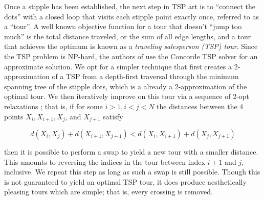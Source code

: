 \documentclass[runningheads]{llncs}
\begin{document}
Once a stipple has been established, the next step in TSP art is to ``connect the dots'' with a closed loop that visits each stipple point exactly once, referred to as a ``tour''.  A well known objective function for a tour that doesn't ``jump too much'' is the total distance traveled, or the sum of all edge lengths, and a tour that achieves the optimum is known as a {\em traveling salesperson (TSP) tour}.  Since the TSP problem is NP-hard, the authors of  \cite{kaplan2005tsp} use the Concorde TSP solver \cite{applegate2001concorde} for an approximate solution. We opt for a simpler technique that first creates a 2-approximation of a TSP from a depth-first traversal through the minimum spanning tree of the stipple dots, which is a already a 2-approximation of the optimal tour.  We then iteratively improve on this tour via a sequence of 2-opt relaxations \cite{johnson1997traveling}; that is, if for some $i > 1, i < j < N$ the distances between the 4 points $X_i, X_{i+1}, X_j$, and $X_{j+1}$ satisfy


  

\begin{equation}
  d(X_i, X_j) + d(X_{i+1}, X_{j+1}) < d(X_i, X_{i+1}) + d(X_j, X_{j+1})
\end{equation}

then it is possible to perform a swap to yield a new tour with a smaller distance.  This amounts to reversing the indices in the tour between index $i+1$ and $j$, inclusive.  We repeat this step as long as such a swap is still possible.  Though this is not guaranteed to yield an optimal TSP tour, it does produce aesthetically pleasing tours which are simple; that is, every crossing is removed.%
\end{document}
